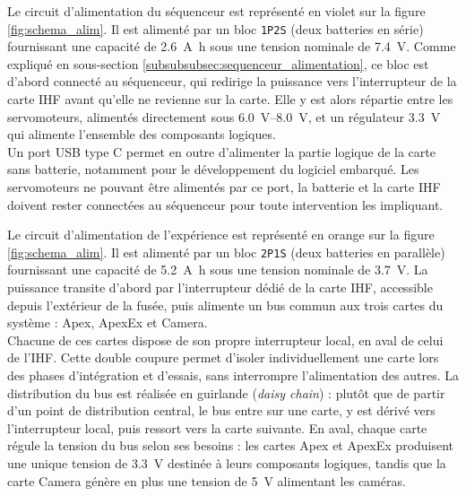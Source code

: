 
Le circuit d'alimentation du séquenceur est représenté en violet sur la figure \ref{fig:schema_alim}. Il est alimenté par un bloc
\verb|1P2S| (deux batteries en série) fournissant une capacité de \SI{2.6}{\ampere\hour} sous une tension nominale de
\SI{7.4}{\volt}. Comme expliqué en sous-section \ref{subsubsubsec:sequenceur_alimentation}, ce bloc est d'abord connecté au
séquenceur, qui redirige la puissance vers l'interrupteur de la carte \acrshort{IHF} avant qu'elle ne revienne sur la carte. Elle y
est alors répartie entre les servomoteurs, alimentés directement sous \SIrange{6.0}{8.0}{\volt}, et un régulateur \SI{3.3}{\volt}
qui alimente l'ensemble des composants logiques.\\

Un port \acrshort{USB} type C permet en outre d'alimenter la partie logique de la carte sans batterie, notamment pour le
développement du logiciel embarqué. Les servomoteurs ne pouvant être alimentés par ce port, la batterie et la carte \acrshort{IHF}
doivent rester connectées au séquenceur pour toute intervention les impliquant.

\newpage


Le circuit d'alimentation de l'expérience est représenté en orange sur la figure \ref{fig:schema_alim}. Il est alimenté par un
bloc \verb|2P1S| (deux batteries en parallèle) fournissant une capacité de \SI{5.2}{\ampere\hour} sous une tension nominale de
\SI{3.7}{\volt}. La puissance transite d'abord par l'interrupteur dédié de la carte \acrshort{IHF}, accessible depuis
l'extérieur de la fusée, puis alimente un bus commun aux trois cartes du système : Apex, ApexEx et Camera.\\

Chacune de ces cartes dispose de son propre interrupteur local, en aval de celui de l'\acrshort{IHF}. Cette double coupure permet
d'isoler individuellement une carte lors des phases d'intégration et d'essais, sans interrompre l'alimentation des autres. La
distribution du bus est réalisée en guirlande (\textit{daisy chain}) : plutôt que de partir d'un point de distribution central, le
bus entre sur une carte, y est dérivé vers l'interrupteur local, puis ressort vers la carte suivante. En aval, chaque carte régule
la tension du bus selon ses besoins : les cartes Apex et ApexEx produisent une unique tension de \SI{3.3}{\volt} destinée à leurs
composants logiques, tandis que la carte Camera génère en plus une tension de \SI{5}{\volt} alimentant les caméras.\\

